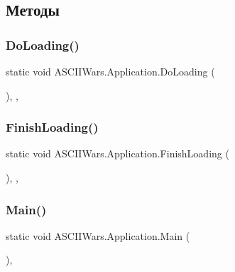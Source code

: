 \subsection{Методы}
\hypertarget{class_a_s_c_i_i_wars_1_1_application_a264d79af3a0048eef7ff8f864fdec698}{}\label{class_a_s_c_i_i_wars_1_1_application_a264d79af3a0048eef7ff8f864fdec698} 
\subsubsection{\texorpdfstring{Do\+Loading()}{DoLoading()}}
{\footnotesize\ttfamily static void A\+S\+C\+I\+I\+Wars.\+Application.\+Do\+Loading (\begin{DoxyParamCaption}{ }\end{DoxyParamCaption})\hspace{0.3cm}{\ttfamily [inline]}, {\ttfamily [static]}, {\ttfamily [private]}}

\hypertarget{class_a_s_c_i_i_wars_1_1_application_a56252f7621e7b373696a7a79d09a052f}{}\label{class_a_s_c_i_i_wars_1_1_application_a56252f7621e7b373696a7a79d09a052f} 
\subsubsection{\texorpdfstring{Finish\+Loading()}{FinishLoading()}}
{\footnotesize\ttfamily static void A\+S\+C\+I\+I\+Wars.\+Application.\+Finish\+Loading (\begin{DoxyParamCaption}{ }\end{DoxyParamCaption})\hspace{0.3cm}{\ttfamily [inline]}, {\ttfamily [static]}, {\ttfamily [private]}}

\hypertarget{class_a_s_c_i_i_wars_1_1_application_a12dbc4ab81c994876ce7bd2664eee54f}{}\label{class_a_s_c_i_i_wars_1_1_application_a12dbc4ab81c994876ce7bd2664eee54f} 
\subsubsection{\texorpdfstring{Main()}{Main()}}
{\footnotesize\ttfamily static void A\+S\+C\+I\+I\+Wars.\+Application.\+Main (\begin{DoxyParamCaption}{ }\end{DoxyParamCaption})\hspace{0.3cm}{\ttfamily [inline]}, {\ttfamily [static]}}

